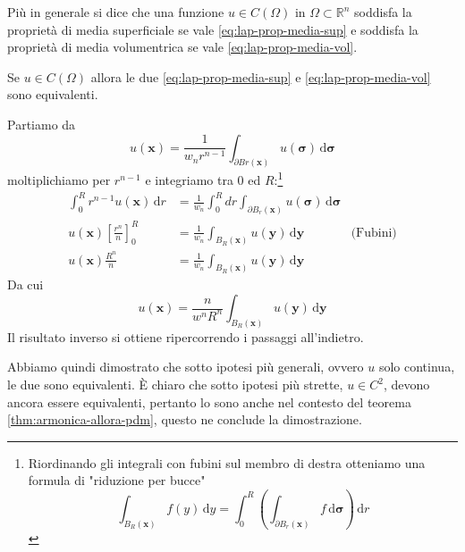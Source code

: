 \documentclass[10pt,a4paper,twoside,openright]{book}
\newcommand{\x}{\mathbf{x}}
\newcommand{\y}{\mathbf{y}}
\newcommand{\sigg}{\bm{\sigma}}
\newcommand{\de}{\,\mathrm d}
\newcommand{\dy}{\de y}
\newcommand{\dr}{\de r}
\newcommand{\dyy}{\de \y}
\newcommand{\dsig}{\de \sigg}
\begin{document}
\begin{definition}[PDM]
	Più in generale si dice che una funzione $u\in C(\Omega)$ in $\Omega \subset \mathbb{R}^{n}$ soddisfa la proprietà di media superficiale se vale \eqref{eq:lap-prop-media-sup} e soddisfa la proprietà di media volumentrica se vale \eqref{eq:lap-prop-media-vol}.
\end{definition}
\begin{theorem}
	Se $u\in C(\Omega)$ allora le due \eqref{eq:lap-prop-media-sup} e \eqref{eq:lap-prop-media-vol} sono equivalenti.
\end{theorem}
\begin{dimostrazione}
	Partiamo da
	\begin{equation*}
		u(\x) =\frac{1}{w_{n} r^{n-1}}\int _{\partial Br(\x)} u(\sigg) \dsig
	\end{equation*}
	moltiplichiamo per $r^{n-1}$ e integriamo tra $0$ ed $R$:\footnote{Riordinando gli integrali con fubini sul membro di destra otteniamo una formula di "riduzione per bucce" 
	\begin{equation*}
		\int _{B_{R}(\x)} f(y) \dy=\int _{0}^{R}\left(\int _{\partial B_{r}(\x)} f\dsig \right) \dr
	\end{equation*}
	}
	\begin{align*}
		\int _{0}^{R} r^{n-1} u(\x) \dr & =\frac{1}{w_{n}}\int _{0}^{R} dr\int _{\partial B_{r}(\x)} u(\sigg) \dsig & \\
		u(\x)\left[\frac{r^{n}}{n}\right]_{0}^{R} & =\frac{1}{w_{n}}\int _{B_{R}(\x)} u(\y) \dyy & \text{(Fubini)}\\
		u(\x)\frac{R^{n}}{n} & =\frac{1}{w_{n}}\int _{B_{R}(\x)} u(\y) \dyy & 
	\end{align*}
	Da cui 
	\begin{equation*}
		u(\x) =\frac{n}{w^{n} R^{n}}\int _{B_{R}(\x)} u(\y) \dyy
	\end{equation*}
	Il risultato inverso si ottiene ripercorrendo i passaggi all'indietro.
\end{dimostrazione}
Abbiamo quindi dimostrato che sotto ipotesi più generali, ovvero $u$ solo continua, le due sono equivalenti. È chiaro che sotto ipotesi più strette, $u\in C^{2}$, devono ancora essere equivalenti, pertanto lo sono anche nel contesto del teorema \ref{thm:armonica-allora-pdm}, questo ne conclude la dimostrazione.
\end{document}

